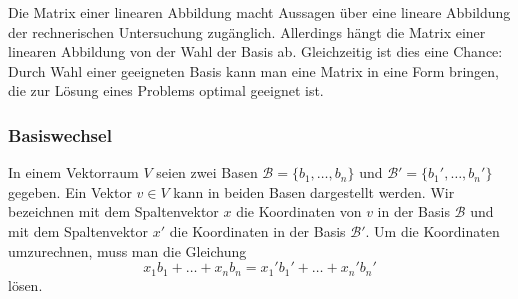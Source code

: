 Die Matrix einer linearen Abbildung macht Aussagen über eine lineare
Abbildung der rechnerischen Untersuchung zugänglich.
Allerdings hängt die Matrix einer linearen Abbildung von der Wahl der
Basis ab.
Gleichzeitig ist dies eine Chance: Durch Wahl einer geeigneten Basis
kann man eine Matrix in eine Form bringen, die zur Lösung eines
Problems optimal geeignet ist.

\subsubsection{Basiswechsel}
In einem Vektorraum $V$ seien zwei Basen $\mathcal{B}=\{b_1,\dots,b_n\}$
und $\mathcal{B}'=\{b_1',\dots,b_n'\}$ gegeben.
Ein Vektor $v\in V$ kann in beiden Basen dargestellt werden.
Wir bezeichnen mit dem Spaltenvektor $x$ die Koordinaten von $v$ in der
Basis $\mathcal{B}$ und mit dem Spaltenvektor $x'$ die Koordinaten
in der Basis $\mathcal{B}'$.
Um die Koordinaten umzurechnen, muss man die Gleichung
\begin{equation}
x_1b_1 + \dots + x_nb_n = x_1'b_1' + \dots + x_n'b_n'
\label{buch:vektoren-und-matrizen:eqn:basiswechselgleichung}
\end{equation}
lösen.

